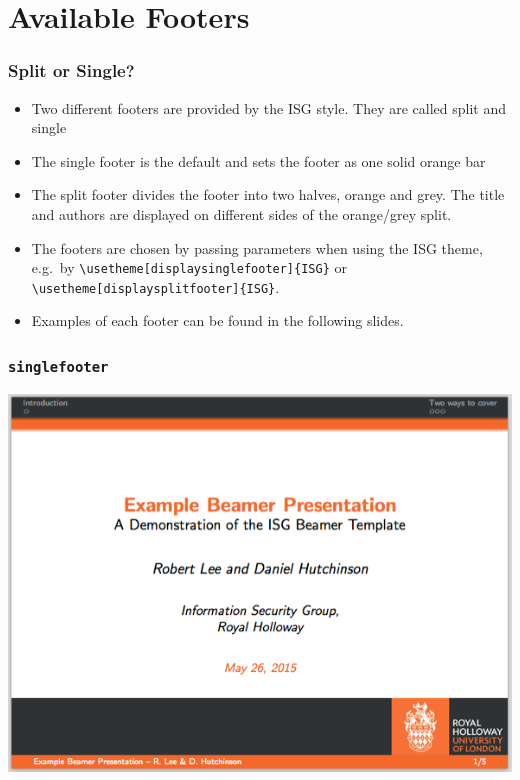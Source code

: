 \documentclass{beamer}
\begin{document}
\section{Available Footers}
\begin{frame}\frametitle{Split or Single?}
\begin{itemize}
	\item Two different footers are provided by the ISG style.  They are called split and single
	\item The single footer is the default and sets the footer as one solid orange bar
	\item The split footer divides the footer into two halves, orange and grey.  The title and authors are displayed on different sides of the orange/grey split.
	\item The footers are chosen by passing parameters when using the ISG theme, e.g.\ by \texttt{\textbackslash usetheme[displaysinglefooter]\{ISG\}} or \texttt{\textbackslash usetheme[displaysplitfooter]\{ISG\}}.
	\item Examples of each footer can be found in the following slides.
\end{itemize}
\end{frame}

\begin{frame}\frametitle{\texttt{singlefooter}}
\begin{center}
	\includegraphics[scale=0.4]{graphics/singlefooter.png}
\end{center}
\end{frame}
\end{document}
